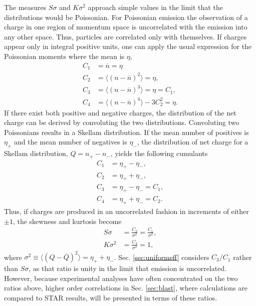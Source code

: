 The measures $S\sigma$ and $K\sigma^2$ approach simple values in the limit that the distributions would be Poissonian. For Poissonian emission the observation of a charge in one region of momentum space is uncorrelated with the emission into any other space. Thus, particles are correlated only with themselves. If charges appear only in integral positive units, one can apply the usual expression for the Poissonian moments where the mean is $\eta$, 
\begin{align}
C_1&=\overline{n}=\eta\\
C_2&=\langle(n-\overline{n})^2\rangle=\eta,\\
C_3&=\langle(n-\overline{n})^3\rangle=\eta=C_1,\\
C_4&=\langle(n-\overline{n})^4\rangle-3C_2^2=\eta.
\end{align}
If there exist both positive and negative charges, the distribution of the net charge can be derived by convoluting the two distributions. Convoluting two Poissonians results in a Skellam distribution. If the mean number of positives is $\eta_+$ and the mean number of negatives is $\eta_-$, the distribution of net charge for a Skellam distribution, $Q=n_+-n_-$, yields the following cumulants
\begin{align}
C_1&=\eta_+-\eta_-,\\
C_2&=\eta_++\eta_-,\\
C_3&=\eta_+-\eta_-=C_1,\\
C_4&=\eta_++\eta_-=C_2.
\end{align}
Thus, if charges are produced in an uncorrelated fashion in increments of either $\pm 1$, the skewness and kurtosis become
\begin{eqnarray}
S\sigma&=\frac{C_3}{\sigma^2}=\frac{C_1}{\sigma^2},\\
K\sigma^2&=\frac{C_4}{\sigma^2}=1,
\end{eqnarray}
where $\sigma^2\equiv\langle(Q-\overline{Q})^2\rangle=\eta_++\eta_-$. Sec. \ref{sec:uniformeff} considers $C_3/C_1$ rather than $S\sigma$, as that ratio is unity in the limit that emission is uncorrelated. However, because experimental analyses have often concentrated on the two ratios above, higher order correlations in Sec. \ref{sec:blast}, where calculations are compared to STAR results, will be presented in terms of these ratios.

